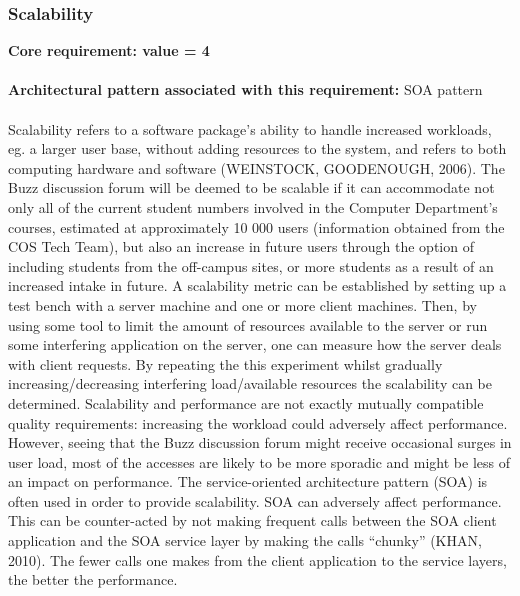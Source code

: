 \documentclass[a4paper]{article}
\begin{document}
\subsubsection{Scalability}
\textbf{Core requirement: value = 4}
\\
\\\textbf{Architectural pattern associated with this requirement:} SOA pattern
\\
\\Scalability refers to a software package’s ability to handle increased workloads, eg. a larger user base, without adding resources to the system, and refers to both computing hardware and software (WEINSTOCK, GOODENOUGH, 2006). The Buzz discussion forum will be deemed to be scalable if it can accommodate not only all of the current student numbers involved in the Computer Department’s courses, estimated at approximately 10 000 users (information obtained from the COS Tech Team), but also an increase in future users through the option of including students from the off-campus sites, or more students as a result of an increased intake in future. A scalability metric can be established by setting up a test bench with a server machine and one or more client machines. Then, by using some tool to limit the amount of resources available to the server or run some interfering application on the server, one can measure how the server deals with client requests. By repeating the this experiment whilst gradually increasing/decreasing interfering load/available resources the scalability can be determined. Scalability and performance are not exactly mutually compatible quality requirements: increasing the workload could adversely affect performance. However, seeing that the Buzz discussion forum might receive occasional surges in user load, most of the accesses are likely to be more sporadic and might be less of an impact on performance. The service-oriented architecture pattern (SOA) is often used in order to provide scalability. SOA can adversely affect performance. This can be counter-acted by not making frequent calls between the SOA client application and the SOA service layer by making the calls “chunky” (KHAN, 2010). The fewer calls one makes from the client application to the service layers, the better the performance. 
\end{document}
